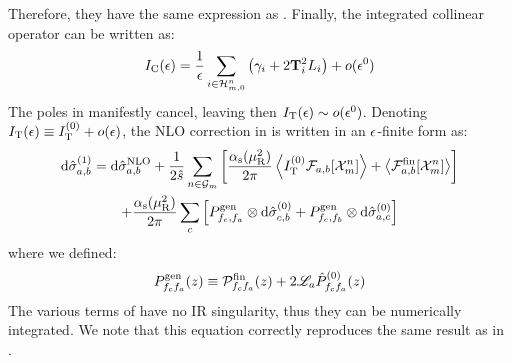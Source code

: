 Therefore, they have the same expression as . Finally, the integrated collinear operator can be written as:
\begin{equation}
  I_\text{C}(\epsilon) = \frac{1}{\epsilon} \sum_{i \in \mathcal{H}^{n}_{m,0}} \left( \gamma_i + 2 \mathbf{T}_i^2 L_i \right) + o(\epsilon^0)
  \label{eq:ic-exp}
\end{equation}
The poles in  manifestly cancel, leaving then $ I_\text{T}(\epsilon) \sim o(\epsilon^0) $. Denoting $ I_\text{T}(\epsilon) \equiv I_\text{T}^{(0)} + o(\epsilon) $, the NLO correction in  is written in an $ \epsilon $-finite form as:
\begin{multline}
  \mathrm{d}\hat{\sigma}_{a,b}^{(1)} = \mathrm{d}\hat{\sigma}_{a,b}^\text{NLO} + \frac{1}{2\hat{s}} \sum_{n \in \mathcal{G}_m} \left[ \frac{\alpha_\text{s}(\mu_\text{R}^2)}{2\pi} \left\langle I_\text{T}^{(0)} \mathcal{F}_{a,b}[\mathcal{X}^{n}_{m}] \right\rangle + \left\langle \mathcal{F}_{a,b}^\text{fin}[\mathcal{X}^{n}_{m}] \right\rangle \right] \\
  + \frac{\alpha_\text{s}(\mu_\text{R}^2)}{2\pi} \sum_c \left[ P^\text{gen}_{f_c , f_a} \otimes \mathrm{d}\hat{\sigma}^{(0)}_{c,b} + P^\text{gen}_{f_c , f_b} \otimes \mathrm{d}\hat{\sigma}^{(0)}_{a,c} \right]
  \label{eq:nlo-finite-massless}
\end{multline}
where we defined:
\begin{equation}
  P^\text{gen}_{f_c f_a}(z) \equiv \mathcal{P}^\text{fin}_{f_c f_a}(z) + 2 \mathscr{L}_a \hat{P}^{(0)}_{f_c f_a}(z)
\end{equation}
The various terms of  have no IR singularity, thus they can be numerically integrated. We note that this equation correctly reproduces the same result as in \cite{rontsch-2509}.










